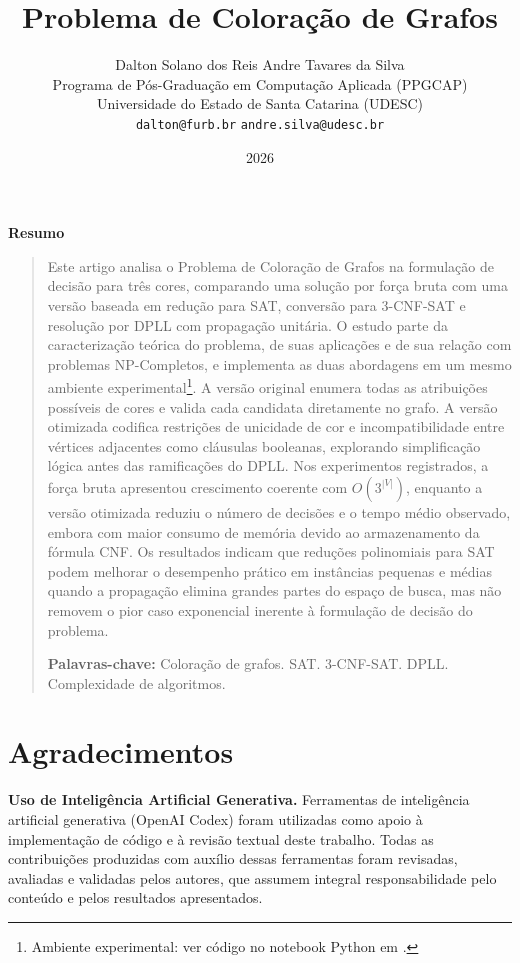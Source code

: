 \documentclass[12pt,oneside]{article}
\title{Problema de Coloração de Grafos}
\author{
Dalton Solano dos Reis \qquad Andre Tavares da Silva\\[0.5em]
\small Programa de Pós-Graduação em Computação Aplicada (PPGCAP)\\
\small Universidade do Estado de Santa Catarina (UDESC)\\
\small\texttt{dalton@furb.br} \qquad
\small\texttt{andre.silva@udesc.br}
}
\date{2026}
\newenvironment{resumoPort}{%
  \par\vspace{1em}%
  \begin{center}\bfseries Resumo\end{center}%
  \begin{quotation}%
}{\end{quotation}}
\begin{document}
\maketitle

\begin{resumoPort}
Este artigo analisa o Problema de Coloração de Grafos na formulação de decisão para três cores, comparando uma solução por força bruta com uma versão baseada em redução para SAT, conversão para 3-CNF-SAT e resolução por DPLL com propagação unitária. O estudo parte da caracterização teórica do problema, de suas aplicações e de sua relação com problemas NP-Completos, e implementa as duas abordagens em um mesmo ambiente experimental\footnote{Ambiente experimental: ver código no notebook Python em \parencite{dalton-reisUDESC_PAA_TFMainipynb}.}. A versão original enumera todas as atribuições possíveis de cores e valida cada candidata diretamente no grafo. A versão otimizada codifica restrições de unicidade de cor e incompatibilidade entre vértices adjacentes como cláusulas booleanas, explorando simplificação lógica antes das ramificações do DPLL. Nos experimentos registrados, a força bruta apresentou crescimento coerente com $O(3^{|V|})$, enquanto a versão otimizada reduziu o número de decisões e o tempo médio observado, embora com maior consumo de memória devido ao armazenamento da fórmula CNF. Os resultados indicam que reduções polinomiais para SAT podem melhorar o desempenho prático em instâncias pequenas e médias quando a propagação elimina grandes partes do espaço de busca, mas não removem o pior caso exponencial inerente à formulação de decisão do problema.

\textbf{Palavras-chave:} Coloração de grafos. SAT. 3-CNF-SAT. DPLL. Complexidade de algoritmos.
\end{resumoPort}












\section*{Agradecimentos}

\textbf{Uso de Inteligência Artificial Generativa.} Ferramentas de inteligência artificial generativa (OpenAI Codex) foram utilizadas como apoio à implementação de código e à revisão textual deste trabalho. Todas as contribuições produzidas com auxílio dessas ferramentas foram revisadas, avaliadas e validadas pelos autores, que assumem integral responsabilidade pelo conteúdo e pelos resultados apresentados.

\printbibliography
\end{document}
